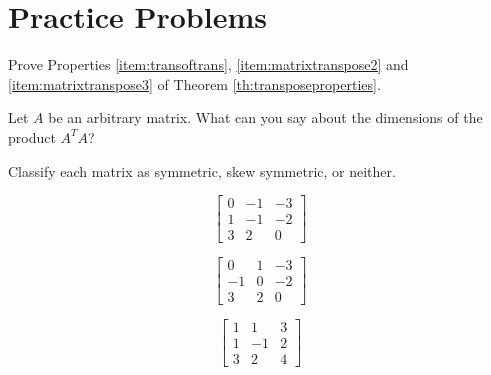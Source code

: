 \documentclass{ximera}
\begin{document}
\section*{Practice Problems}


\begin{problem}\label{prob:transpropsproofs} Prove Properties \ref{item:transoftrans}, \ref{item:matrixtranspose2} and \ref{item:matrixtranspose3} of Theorem \ref{th:transposeproperties}.
\end{problem}

\begin{problem}\label{prob:ATtimesAdimensions} Let $A$ be an arbitrary matrix.  What can you say about the dimensions of the product $A^TA$?
\end{problem}

\begin{problem}
Classify each matrix as symmetric, skew symmetric, or neither.
\begin{problem}\label{prob:symmetricclassification1}
$$\begin{bmatrix}
0 & -1 & -3\\
1 & -1 & -2\\
3 &  2 &  0
\end{bmatrix}$$
\begin{multipleChoice}
   \end{multipleChoice}
\end{problem}
\begin{problem}\label{prob:symmetricclassification2}
$$\begin{bmatrix}
0 & 1 & -3\\
-1 & 0 & -2\\
3 &  2 &  0
\end{bmatrix}$$
\begin{multipleChoice}
   \end{multipleChoice}

\end{problem}
\begin{problem}\label{prob:symmetricclassification3}
$$\begin{bmatrix}
1 & 1 & 3\\
1 & -1 & 2\\
3 &  2 &  4
\end{bmatrix}$$
\begin{multipleChoice}
   \end{multipleChoice}
\end{problem}
\end{problem}
\end{document}
